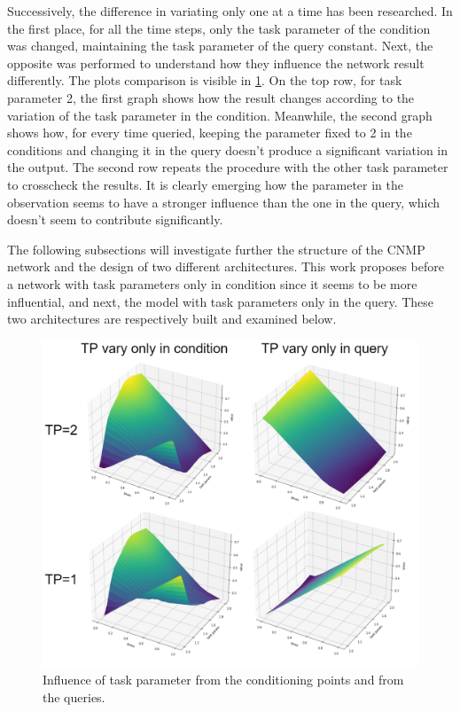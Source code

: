 Successively, the difference in variating only one at a time has been researched. In the first place, for all the time steps, only the task parameter of the condition was changed, maintaining the task parameter of the query constant. Next, the opposite was performed to understand how they influence the network result differently. The plots comparison is visible in \cref{fig:tp-influence}.
On the top row, for task parameter 2, the first graph shows how the result changes according to the variation of the task parameter in the condition. Meanwhile, the second graph shows how, for every time queried, keeping the parameter fixed to 2 in the conditions and changing it in the query doesn't produce a significant variation in the output. 
The second row repeats the procedure with the other task parameter to crosscheck the results. 
It is clearly emerging how the parameter in the observation seems to have a stronger influence than the one in the query, which doesn't seem to contribute significantly. 

The following subsections will investigate further the structure of the CNMP network and the design of two different architectures. This work proposes before a network with task parameters only in condition since it seems to be more influential, and next, the model with task parameters only in the query. These two architectures are respectively built and examined below.
\begin{figure}
    \centering
    \includegraphics[width=0.8\linewidth]{figures/comparisonCNMPtp-influence.png}
    \caption{ Influence of task parameter from the conditioning points and from the queries. }
    \label{fig:tp-influence}
\end{figure}



